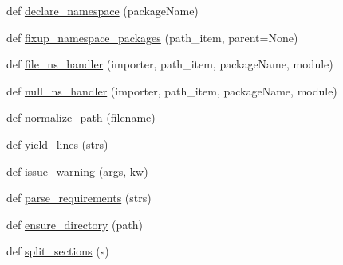 \begin{DoxyCompactItemize}
\item 
def \hyperlink{namespacepkg__resources_a56e0436c68d4a6a6d3674c418b628593}{declare\+\_\+namespace} (package\+Name)
\item 
def \hyperlink{namespacepkg__resources_a636b14ccc961320b5238ba240e2bfc24}{fixup\+\_\+namespace\+\_\+packages} (path\+\_\+item, parent=None)
\item 
def \hyperlink{namespacepkg__resources_ac4760ef4501d5e05f68cf9fef9af1cbe}{file\+\_\+ns\+\_\+handler} (importer, path\+\_\+item, package\+Name, module)
\item 
def \hyperlink{namespacepkg__resources_a518a17d31aee5bf71eee289b82f966d9}{null\+\_\+ns\+\_\+handler} (importer, path\+\_\+item, package\+Name, module)
\item 
def \hyperlink{namespacepkg__resources_a92fefe633fcea7303e233a72b5cb023b}{normalize\+\_\+path} (filename)
\item 
def \hyperlink{namespacepkg__resources_a0eafea5b96ff98a74cd3340af8bc1cc6}{yield\+\_\+lines} (strs)
\item 
def \hyperlink{namespacepkg__resources_a0d5beebf84841e70b7b06058e4fb4cc2}{issue\+\_\+warning} (args, kw)
\item 
def \hyperlink{namespacepkg__resources_a2f0871c15153dc97a4a5b22c363a541e}{parse\+\_\+requirements} (strs)
\item 
def \hyperlink{namespacepkg__resources_a184f9bf0699b317e84046c58d6b224cf}{ensure\+\_\+directory} (path)
\item 
def \hyperlink{namespacepkg__resources_ac538bbed636a0b964382693ba2a06742}{split\+\_\+sections} (s)
\end{DoxyCompactItemize}
